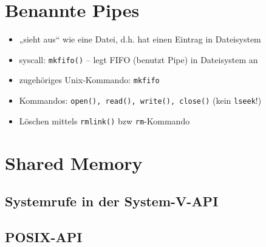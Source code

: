 \section{Benannte Pipes}
\begin{itemize}
\item „sieht aus“ wie eine Datei, d.h. hat einen Eintrag in Dateisystem
\item syscall: \lstinline$mkfifo()$ -- legt FIFO (benutzt Pipe) in Dateisystem an
\item zugehöriges Unix-Kommando: \lstinline$mkfifo$
\item Kommandos: \lstinline$open(), read(), write(), close()$ (kein \lstinline$lseek$!)
\item Löschen mittels \lstinline$rmlink()$ bzw \lstinline$rm$-Kommando
\end{itemize}

\section{Shared Memory}
\subsection{Systemrufe in der System-V-API}
\subsection{POSIX-API}




























